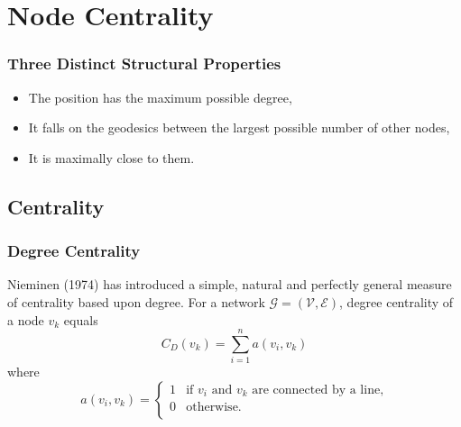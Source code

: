 \documentclass{beamer}
\begin{document}


\section{Node Centrality}
\begin{frame}
\frametitle{Three Distinct Structural Properties}
\begin{itemize}
	\item The position has the maximum possible degree,
	\item It falls on the geodesics between the largest possible number of other nodes, 
    \item It is maximally close to them.
\end{itemize}
\end{frame}

\subsection{Centrality}
\begin{frame}
\frametitle{Degree Centrality}
Nieminen (1974) has introduced a simple, natural and perfectly general measure of centrality based upon degree.
For a network $\mathcal{G}=(\mathcal{V},\mathcal{E})$, degree centrality of a node $v_k$ equals
\color{iseblue}
\begin{displaymath}
C_{D}(v_{k})=\sum_{i=1}^n a(v_{i},v_{k})
\end{displaymath}
\color{black}
where 
\begin{displaymath}
 a(v_{i},v_{k}) = \left\{\begin{array}{ll}
1 & \textrm{if $v_{i}$ and $v_{k}$ are connected by a line,}\\
0 & \textrm{otherwise.}\\
\end{array} \right.
\end{displaymath}
\end{frame}
\end{document}
